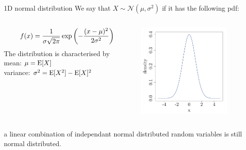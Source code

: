 \begin{frame}{1D normal distribution}
We say that $X \sim \mathcal{N}(\mu,\sigma^2)$ if it has the following pdf:
\begin{columns}
  \begin{column}{0.6\textwidth}
  \begin{equation*}
  f(x) = \frac{1}{\sigma \sqrt{2 \pi}} \exp \left(-\frac{(x-\mu)^2}{2 \sigma^2} \right)
  \vspace{3mm}
  \end{equation*}
  The distribution is characterised by\\
      \qquad mean: $\mu = \operatorname*{E} [X]$\\
      \qquad variance: $\sigma^2 = \operatorname*{E} [X^2] - \operatorname*{E}[X]^2$
  \end{column}
  \begin{column}{0.5\textwidth}
  \begin{center}
   \includegraphics[height=4.7cm]{1_stat_models/figures/R/MVN_dens1} 
  \end{center}
  \end{column}
\end{columns}
\vspace{2mm}
 a linear combination of independant normal distributed random variables is still normal distributed.
\end{frame}

